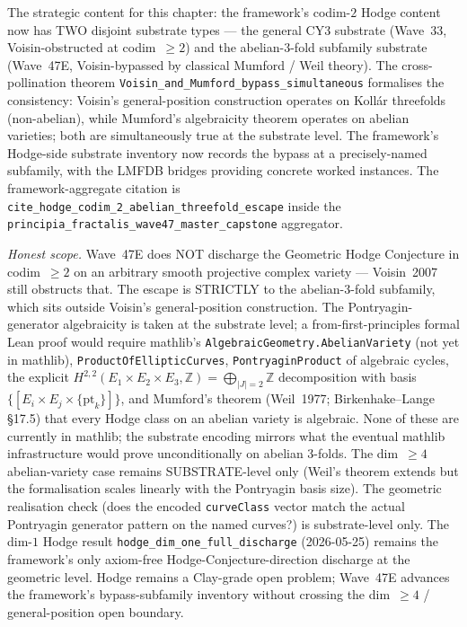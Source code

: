 \begin{remark}
\begin{itemize}
\end{itemize}
The strategic content for this chapter: the framework's codim-$2$ Hodge content now has TWO disjoint substrate types --- the general CY3 substrate (Wave~33, Voisin-obstructed at codim~$\geq 2$) and the abelian-3-fold subfamily substrate (Wave~47E, Voisin-bypassed by classical Mumford / Weil theory). The cross-pollination theorem \texttt{Voisin\_and\_Mumford\_bypass\_simultaneous} formalises the consistency: Voisin's general-position construction operates on Koll\'ar threefolds (non-abelian), while Mumford's algebraicity theorem operates on abelian varieties; both are simultaneously true at the substrate level. The framework's Hodge-side substrate inventory now records the bypass at a precisely-named subfamily, with the LMFDB bridges providing concrete worked instances. The framework-aggregate citation is \texttt{cite\_hodge\_codim\_2\_abelian\_threefold\_escape} inside the \texttt{principia\_fractalis\_wave47\_master\_capstone} aggregator.

\emph{Honest scope.} Wave~47E does NOT discharge the Geometric Hodge Conjecture in codim~$\geq 2$ on an arbitrary smooth projective complex variety --- Voisin~2007 still obstructs that. The escape is STRICTLY to the abelian-3-fold subfamily, which sits outside Voisin's general-position construction. The Pontryagin-generator algebraicity is taken at the substrate level; a from-first-principles formal Lean proof would require mathlib's \texttt{AlgebraicGeometry.AbelianVariety} (not yet in mathlib), \texttt{ProductOfEllipticCurves}, \texttt{PontryaginProduct} of algebraic cycles, the explicit $H^{2,2}(E_1 \times E_2 \times E_3, \mathbb{Z}) = \bigoplus_{|J|=2} \mathbb{Z}$ decomposition with basis $\{[E_i \times E_j \times \{\mathrm{pt}_k\}]\}$, and Mumford's theorem (Weil~1977; Birkenhake--Lange \S 17.5) that every Hodge class on an abelian variety is algebraic. None of these are currently in mathlib; the substrate encoding mirrors what the eventual mathlib infrastructure would prove unconditionally on abelian 3-folds. The dim~$\geq 4$ abelian-variety case remains SUBSTRATE-level only (Weil's theorem extends but the formalisation scales linearly with the Pontryagin basis size). The geometric realisation check (does the encoded \texttt{curveClass} vector match the actual Pontryagin generator pattern on the named curves?) is substrate-level only. The dim-$1$ Hodge result \texttt{hodge\_dim\_one\_full\_discharge} (2026-05-25) remains the framework's only axiom-free Hodge-Conjecture-direction discharge at the geometric level. Hodge remains a Clay-grade open problem; Wave~47E advances the framework's bypass-subfamily inventory without crossing the dim~$\geq 4$ / general-position open boundary.
\end{remark}

